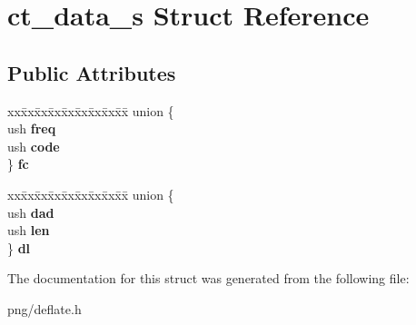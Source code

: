 \hypertarget{structct__data__s}{}\section{ct\+\_\+data\+\_\+s Struct Reference}
\label{structct__data__s}
\subsection*{Public Attributes}
\begin{DoxyCompactItemize}
\item 
\begin{tabbing}
xx\=xx\=xx\=xx\=xx\=xx\=xx\=xx\=xx\=\kill
union \{\\
\>ush {\bfseries freq}\\
\>ush {\bfseries code}\\
\} {\bfseries fc}\hypertarget{structct__data__s_afc1f3ab6d927f91dd49bae89bcefd1f5}{}\label{structct__data__s_afc1f3ab6d927f91dd49bae89bcefd1f5}
\\

\end{tabbing}\item 
\begin{tabbing}
xx\=xx\=xx\=xx\=xx\=xx\=xx\=xx\=xx\=\kill
union \{\\
\>ush {\bfseries dad}\\
\>ush {\bfseries len}\\
\} {\bfseries dl}\hypertarget{structct__data__s_a39e59bc8e97ffb3c7c71450cd739c782}{}\label{structct__data__s_a39e59bc8e97ffb3c7c71450cd739c782}
\\

\end{tabbing}\end{DoxyCompactItemize}


The documentation for this struct was generated from the following file\+:\begin{DoxyCompactItemize}
\item 
png/deflate.\+h\end{DoxyCompactItemize}
